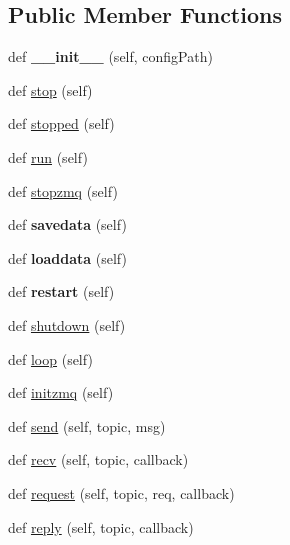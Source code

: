 \subsection*{Public Member Functions}
\begin{DoxyCompactItemize}
\item 
\mbox{\label{classsrc_1_1_node_1_1_node_aaa2312f4ae71066c441c75e623a5272b}} 
def {\bfseries \+\_\+\+\_\+init\+\_\+\+\_\+} (self, config\+Path)
\item 
def \mbox{\hyperlink{classsrc_1_1_node_1_1_node_a57c5c681b709272de35533e1c02ef394}{stop}} (self)
\item 
def \mbox{\hyperlink{classsrc_1_1_node_1_1_node_a802978364e02620c7c74515b21f14654}{stopped}} (self)
\item 
def \mbox{\hyperlink{classsrc_1_1_node_1_1_node_a362a8826afeeb04d85aed9e0c9f82e22}{run}} (self)
\item 
def \mbox{\hyperlink{classsrc_1_1_node_1_1_node_a8041d0079f6d0526756bc037a6c8a802}{stopzmq}} (self)
\item 
\mbox{\label{classsrc_1_1_node_1_1_node_a5258d33ae4917f2b14eb9cca1b20580f}} 
def {\bfseries savedata} (self)
\item 
\mbox{\label{classsrc_1_1_node_1_1_node_a0474ce7ae845f0686b03dfdef3615d4a}} 
def {\bfseries loaddata} (self)
\item 
\mbox{\label{classsrc_1_1_node_1_1_node_a5b226b15006ad082b63316cdd6f29f79}} 
def {\bfseries restart} (self)
\item 
def \mbox{\hyperlink{classsrc_1_1_node_1_1_node_a0dd2a9b337a3c3d8ae91178043f60230}{shutdown}} (self)
\item 
def \mbox{\hyperlink{classsrc_1_1_node_1_1_node_a0c82a88ce23ea5b4a117fb91f72a14dd}{loop}} (self)
\item 
def \mbox{\hyperlink{classsrc_1_1_node_1_1_node_a28f03366fdb99400001080178be63525}{initzmq}} (self)
\item 
def \mbox{\hyperlink{classsrc_1_1_node_1_1_node_a901953eab0e8459816753b0dab20853f}{send}} (self, topic, msg)
\item 
def \mbox{\hyperlink{classsrc_1_1_node_1_1_node_a3ca4283da7b7b918412cfffd3833e26d}{recv}} (self, topic, callback)
\item 
def \mbox{\hyperlink{classsrc_1_1_node_1_1_node_ac92e0c1099d7fc66a6a2506ea03407d1}{request}} (self, topic, req, callback)
\item 
def \mbox{\hyperlink{classsrc_1_1_node_1_1_node_a6fee164df1e6f3664f41199258c96810}{reply}} (self, topic, callback)
\end{DoxyCompactItemize}
